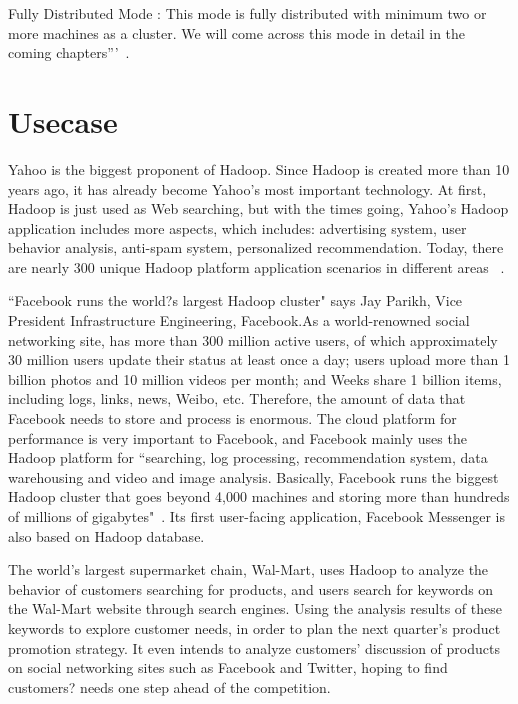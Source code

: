 Fully Distributed Mode : This mode is fully distributed with minimum two or more 
machines as a cluster. We will come across this mode in detail in the coming 
chapters'''~\cite{hid-sp18-508-hadoop}. 


\section{Usecase}
Yahoo is the biggest proponent of Hadoop. Since Hadoop is created more than 10 
years ago, it has already become Yahoo's most important technology. At first, 
Hadoop is just used as Web searching, but with the times going, Yahoo's Hadoop 
application includes more aspects, which includes: advertising system, user 
behavior analysis, anti-spam system, personalized recommendation. Today, there 
are nearly 300 unique Hadoop platform application scenarios in different 
areas ~\cite{hid-sp18-508-yahoo}.

``Facebook runs the world?s largest Hadoop cluster" says Jay Parikh, Vice President 
Infrastructure Engineering, Facebook.As a world-renowned social networking site, has 
more than 300 million active users, of which approximately 30 million users update 
their status at least once a day; users upload more than 1 billion photos and 10 
million videos per month; and Weeks share 1 billion items, including logs, links, 
news, Weibo, etc. Therefore, the amount of data that Facebook needs to store and 
process is enormous. The cloud platform for performance is very important to Facebook, 
and Facebook mainly uses the Hadoop platform for ``searching, log processing, 
recommendation system, data warehousing and video and image analysis. Basically, 
Facebook runs the biggest Hadoop cluster that goes beyond 4,000 machines and storing 
more than hundreds of millions of gigabytes"~\cite{hid-sp18-508-fb}. Its first 
user-facing application, Facebook Messenger is also based on Hadoop database.

The world's largest supermarket chain, Wal-Mart, uses Hadoop to analyze the behavior 
of customers searching for products, and users search for keywords on the Wal-Mart 
website through search engines. Using the analysis results of these keywords to 
explore customer needs, in order to plan the next quarter's product promotion strategy. 
It even intends to analyze customers' discussion of products on social networking 
sites such as Facebook and Twitter, hoping to find customers? needs one step ahead 
of the competition.




